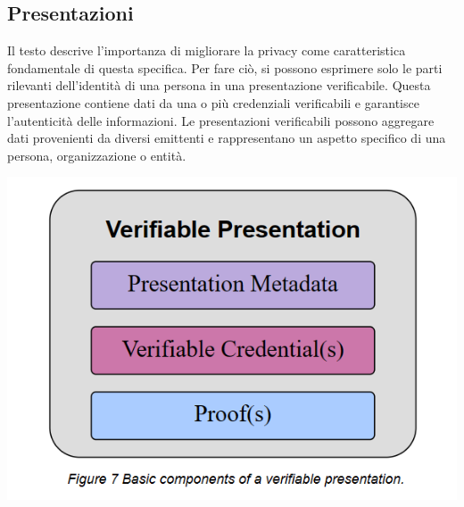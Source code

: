 \subsection{Presentazioni}
Il testo descrive l'importanza di migliorare la privacy come caratteristica fondamentale di questa specifica. Per fare ciò, si possono esprimere solo le parti rilevanti 
dell'identità di una persona in una presentazione verificabile. Questa presentazione contiene dati da una o più credenziali verificabili e garantisce l'autenticità delle informazioni. 
Le presentazioni verificabili possono aggregare dati provenienti da diversi emittenti e rappresentano un aspetto specifico di una persona, organizzazione o entità.
\begin{center}
	\includegraphics[scale = 1]{./res/images/Immaginew3c3.png}
\end{center}

